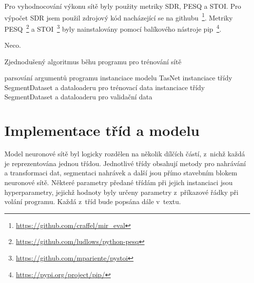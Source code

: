 Pro vyhodnocování výkonu sítě byly použity metriky SDR, PESQ a STOI. Pro výpočet SDR jsem použil zdrojový kód nacházející se na githubu~\footnote{\url{https://github.com/craffel/mir_eval}}. Metriky PESQ~\footnote{\url{https://github.com/ludlows/python-pesq}} a STOI~\footnote{\url{https://github.com/mpariente/pystoi}} byly nainstalovány pomocí balíkového nástroje pip~\footnote{\url{https://pypi.org/project/pip/}}.

\bigskip

Neco.

\begin{algorithm}[H]
\caption{\label{alg:zakladnibeh}Zjednodušený algoritmus běhu programu pro trénování sítě}
\SetNoFillComment
 
 parsování argumentů programu\;
 instanciace modelu TasNet\;
 instanciace třídy SegmentDataset a dataloaderu pro trénovací data\;
 instanciace třídy SegmentDataset a dataloaderu pro validační data\;

\end{algorithm}


\section{Implementace tříd a modelu}
Model neuronové sítě byl logicky rozdělen na několik dílčích částí, z~nichž každá je reprezentována jednou třídou. Jednotlivé třídy obsahují metody pro nahrávání a transformaci dat, segmentaci nahrávek a další jsou přímo stavebním blokem neuronové sítě. Některé parametry předané třídám při jejich instanciaci jsou hyperparametry, jejichž hodnoty byly určeny parametry z~příkazové řádky při volání programu. Každá z~tříd bude popsána dále v~textu.


